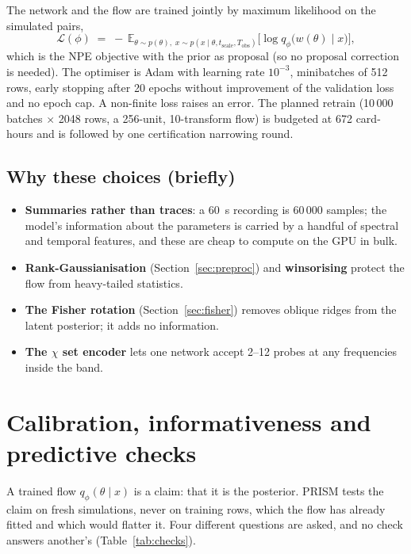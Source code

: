 \documentclass[10pt,a4paper]{article}
\newcommand{\Tobs}{T_{\mathrm{obs}}}
\newcommand{\tscale}{t_{\mathrm{scale}}}
\begin{document}
The network and the flow are trained jointly by maximum likelihood on the simulated pairs,
\begin{equation}
\mathcal L(\phi)\;=\;-\,\mathbb E_{\theta\sim p(\theta),\;x\sim p(x\mid\theta,\tscale,\Tobs)}\bigl[\log q_\phi\bigl(w(\theta)\mid x\bigr)\bigr],
\end{equation}
which is the NPE objective with the prior as proposal (so no proposal correction is needed). The optimiser is Adam with
learning rate $10^{-3}$, minibatches of 512 rows, early stopping after 20 epochs without improvement of the
validation loss and no epoch cap. A non-finite loss raises an error. The planned retrain
(10\,000 batches $\times$ 2048 rows, a 256-unit, 10-transform flow) is budgeted at 672 card-hours and is followed by
one certification narrowing round.

\subsection{Why these choices (briefly)}

\begin{itemize}
  \item \textbf{Summaries rather than traces}: a 60~s recording is 60\,000 samples; the model's information about the
        parameters is carried by a handful of spectral and temporal features, and these are cheap to compute on the
        GPU in bulk.
  \item \textbf{Rank-Gaussianisation} (Section~\ref{sec:preproc}) and \textbf{winsorising} protect the flow from
        heavy-tailed statistics.
  \item \textbf{The Fisher rotation} (Section~\ref{sec:fisher}) removes oblique ridges from the latent posterior;
        it adds no information.
  \item \textbf{The $\chi$ set encoder} lets one network accept 2--12 probes at any frequencies inside the band.
\end{itemize}

\section{Calibration, informativeness and predictive checks}\label{sec:calib}

A trained flow $q_\phi(\theta\mid x)$ is a claim: that it is the posterior. PRISM tests the claim on fresh
simulations, never on training rows, which the flow has already fitted and which would flatter it. Four different
questions are asked, and no check answers another's (Table~\ref{tab:checks}).
\end{document}

